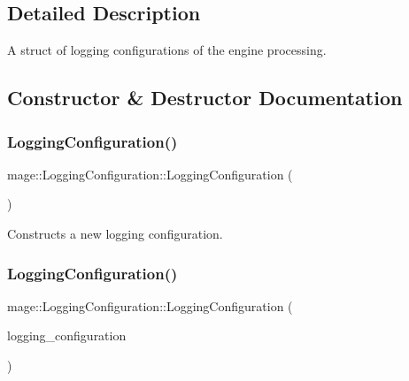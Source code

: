 \subsection{Detailed Description}
A struct of logging configurations of the engine processing. 

\subsection{Constructor \& Destructor Documentation}
\hypertarget{structmage_1_1_logging_configuration_a3d397c3ce26c1c42c9ae4a391391c6f9}{}\label{structmage_1_1_logging_configuration_a3d397c3ce26c1c42c9ae4a391391c6f9} 
\subsubsection{\texorpdfstring{Logging\+Configuration()}{LoggingConfiguration()}\hspace{0.1cm}{\footnotesize\ttfamily [1/2]}}
{\footnotesize\ttfamily mage\+::\+Logging\+Configuration\+::\+Logging\+Configuration (\begin{DoxyParamCaption}{ }\end{DoxyParamCaption})}

Constructs a new logging configuration. \hypertarget{structmage_1_1_logging_configuration_a8e4ccd4301f5544213edd3b600cccff9}{}\label{structmage_1_1_logging_configuration_a8e4ccd4301f5544213edd3b600cccff9} 
\subsubsection{\texorpdfstring{Logging\+Configuration()}{LoggingConfiguration()}\hspace{0.1cm}{\footnotesize\ttfamily [2/2]}}
{\footnotesize\ttfamily mage\+::\+Logging\+Configuration\+::\+Logging\+Configuration (\begin{DoxyParamCaption}\item[{const \hyperlink{structmage_1_1_logging_configuration}{Logging\+Configuration} \&}]{logging\+\_\+configuration }\end{DoxyParamCaption})\hspace{0.3cm}{\ttfamily [default]}}

